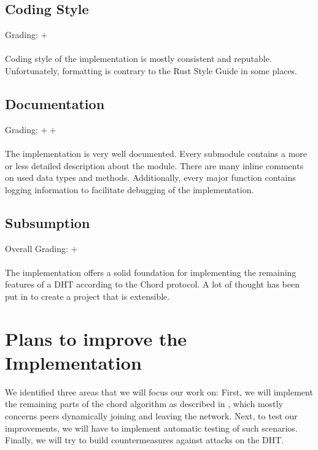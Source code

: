 \documentclass[a4paper, 11pt]{article}
\begin{document}
\subsection*{Coding Style}
Grading: $+$\\
\\
Coding style of the implementation is mostly consistent and reputable.
Unfortunately, formatting is contrary to the Rust Style Guide \cite{RustStyleGuide} in some places.


\subsection*{Documentation}
Grading: $++$\\
\\
The implementation is very well documented.
Every submodule contains a more or less detailed description about the module.
There are many inline comments on used data types and methods.
Additionally, every major function contains logging information to facilitate debugging of the implementation.


\subsection*{Subsumption}
Overall Grading: $+$\\
\\
The implementation offers a solid foundation for implementing the remaining features of a DHT according to the Chord protocol. 
A lot of thought has been put in to create a project that is extensible.

\section*{Plans to improve the Implementation}
We identified three areas that we will focus our work on:
First, we will implement the remaining parts of the chord algorithm as described in \cite{stoica2001chord}, which mostly concerns peers dynamically joining and leaving the network. 
Next, to test our improvements, we will have to implement automatic testing of such scenarios.
Finally, we will try to build countermeasures against attacks on the DHT.
\end{document}
